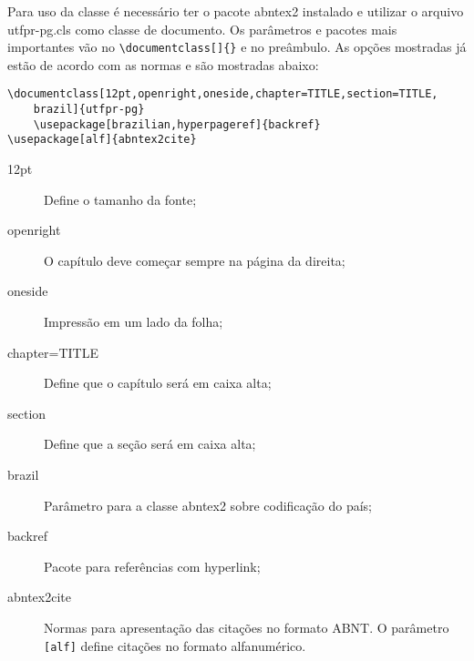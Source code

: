 \documentclass[12pt,openright,oneside,chapter=TITLE,section=TITLE,
	brazil]{utfpr-pg}
\begin{document}
 Para uso da classe é necessário ter o pacote \textsf{abntex2} instalado e utilizar o arquivo \textsf{utfpr-pg.cls} como classe de documento. Os parâmetros e pacotes mais importantes vão no \verb|\documentclass[]{}| e no preâmbulo. As opções mostradas já estão de acordo com as normas e são mostradas abaixo:
 \begin{verbatim}
\documentclass[12pt,openright,oneside,chapter=TITLE,section=TITLE,
	brazil]{utfpr-pg}
	\usepackage[brazilian,hyperpageref]{backref}
\usepackage[alf]{abntex2cite}
 \end{verbatim}
 \begin{description}
	\item[12pt]	Define o tamanho da fonte;
	\item[openright]	O capítulo deve começar sempre na página da direita;
	\item[oneside]	Impressão em um lado da folha;
	\item[chapter=TITLE]	Define que o capítulo será em caixa alta;
	\item[section]	Define que a seção será em caixa alta;
	\item[brazil]	Parâmetro para a classe abntex2 sobre codificação do país;
	\item[backref]	Pacote para referências com hyperlink;
	\item[abntex2cite]	Normas para apresentação das citações no formato ABNT. O parâmetro \verb|[alf]| define citações no formato alfanumérico.
 \end{description}





\nocite{Knuth:1997:ACP:260999,Knuth:1997:ACP:270146,Knuth:1998:ACP:280635}


\end{document}
